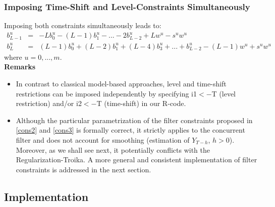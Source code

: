 \documentclass[11pt]{article}
\begin{document}
\subsubsection{Imposing Time-Shift and Level-Constraints Simultaneously}

Imposing both constraints simultaneously leads to:
\begin{eqnarray}\label{cons2}
b_{L-1}^u&=&-Lb_0^u-(L-1)b_1^u-...-2b_{L-2}^u+Lw^u-s^uw^u\\
b_{L}^u&=&(L-1)b_0^u+(L-2)b_1^u+(L-4)b_3^u+...+b_{L-2}^u-(L-1)w^u+s^uw^u\label{cons3}
\end{eqnarray}
where $u=0,...,m$. \\


\textbf{Remarks}
\begin{itemize}
\item In contrast to classical model-based approaches, level and time-shift restrictions can be imposed independently by specifying i1$<-$T (level restriction) and/or i2$<-$T (time-shift) in our R-code. 
\item Although the particular parametrization of the filter constraints proposed in \ref{cons2} and \ref{cons3} is formally correct, it strictly applies to the concurrent filter and does not account for smoothing (estimation of $Y_{T-h}$, $h>0$). Moreover, as we shall see next, it potentially conflicts with the Regularization-Troika. A more general and consistent implementation of filter constraints is addressed in the next section.
\end{itemize}


\subsection{Implementation}\label{implement}
\end{document}

